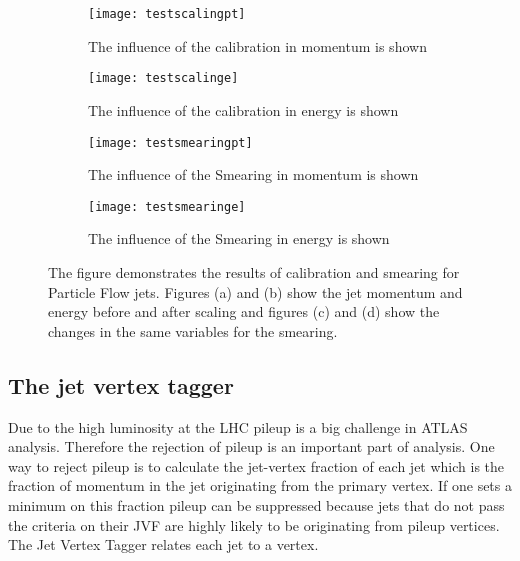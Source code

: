 \begin{figure}
\centering
\begin{subfigure}[b]{0.5\figwidth}
\texttt{[image: testscalingpt]}
\caption[Influence of the JES on the transversal momentum]{The influence of the calibration in momentum is shown}
\label{fig:testscalingpt}
\end{subfigure}
\quad
\begin{subfigure}[b]{0.5\figwidth}
\texttt{[image: testscalinge]}
\caption[Influence of the JES on the energy]{The influence of the calibration in energy is shown}
\label{fig:testscalinge}
\end{subfigure}


\begin{subfigure}[b]{0.5\figwidth}
\texttt{[image: testsmearingpt]}
\caption[Influence of the Smearing on the transversal momentum]{The influence of the Smearing in momentum is shown}
\label{fig:testsmearingpt}
\end{subfigure}
\quad
\begin{subfigure}[b]{0.5\figwidth}
\texttt{[image: testsmearinge]}
\caption[Influence of the Smearing on the energy]{The influence of the Smearing in energy is shown}
\label{fig:testsmearinge}
\end{subfigure}
\caption[Jet Calibration and Smearing]{The figure demonstrates the results of calibration and smearing for Particle Flow jets. Figures (a) and (b) show the jet momentum and energy before and after scaling and figures (c) and (d) show the changes in the same variables for the smearing.}
\label{jetsmearingandcalibration}
\end{figure}


\subsection{The jet vertex tagger}

Due to the high luminosity at the LHC pileup is a big challenge in ATLAS analysis. Therefore the rejection of pileup is an important part of analysis. One way to reject pileup is to calculate the jet-vertex fraction of each jet which is the fraction of momentum in the jet originating from the primary vertex. If one sets a minimum on this fraction pileup can be suppressed because jets that do not pass the criteria on their JVF are highly likely to be originating from pileup vertices. The Jet Vertex Tagger relates each jet to a vertex.


